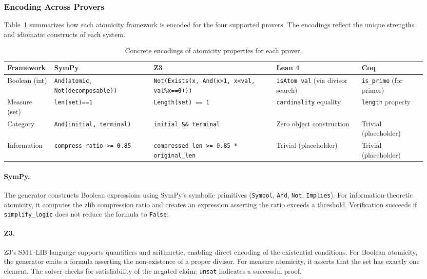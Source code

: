 \subsubsection{Encoding Across Provers}

Table~\ref{tab:prover_encodings} summarizes how each atomicity framework is encoded for the four supported provers. The encodings reflect the unique strengths and idiomatic constructs of each system.

\begin{table}[htbp]
\centering
\caption{Concrete encodings of atomicity properties for each prover.}
\label{tab:prover_encodings}
\small
\begin{tabular}{p{2.2cm} p{2.8cm} p{2.8cm} p{2.5cm} p{2.5cm}}
\toprule
\textbf{Framework} & \textbf{SymPy} & \textbf{Z3} & \textbf{Lean 4} & \textbf{Coq} \\
\midrule
Boolean (int) & \texttt{And(atomic, Not(decomposable))} & \texttt{Not(Exists(x, And(x>1, x<val, val\%x==0)))} & \texttt{isAtom val} (via divisor search) & \texttt{is\_prime} (for primes) \\
Measure (set) & \texttt{len(set)==1} & \texttt{Length(set) == 1} & \texttt{cardinality} equality & \texttt{length} property \\
Category & \texttt{And(initial, terminal)} & \texttt{initial \&\& terminal} & Zero object construction & Trivial (placeholder) \\
Information & \texttt{compress\_ratio >= 0.85} & \texttt{compressed\_len >= 0.85 * original\_len} & Trivial (placeholder) & Trivial (placeholder) \\
\bottomrule
\end{tabular}
\end{table}

\paragraph{SymPy.} The generator constructs Boolean expressions using SymPy's symbolic primitives (\texttt{Symbol}, \texttt{And}, \texttt{Not}, \texttt{Implies}). For information-theoretic atomicity, it computes the zlib compression ratio and creates an expression asserting the ratio exceeds a threshold. Verification succeeds if \texttt{simplify\_logic} does not reduce the formula to \texttt{False}.

\paragraph{Z3.} Z3's SMT-LIB language supports quantifiers and arithmetic, enabling direct encoding of the existential conditions. For Boolean atomicity, the generator emits a formula asserting the non-existence of a proper divisor. For measure atomicity, it asserts that the set has exactly one element. The solver checks for satisfiability of the negated claim; \texttt{unsat} indicates a successful proof.

